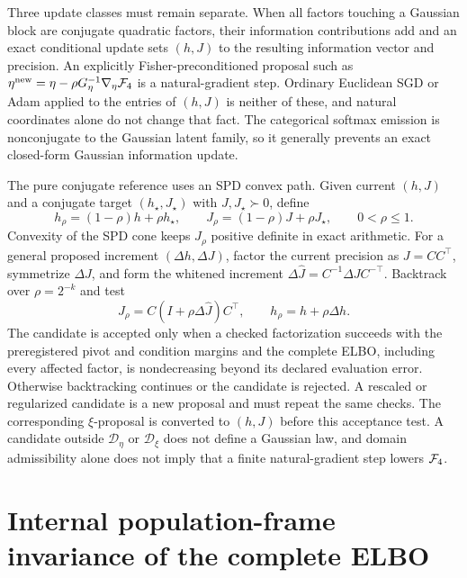 Three update classes must remain separate. When all factors touching a Gaussian block are conjugate quadratic factors, their information contributions add and an exact conditional update sets $(h,J)$ to the resulting information vector and precision. An explicitly Fisher-preconditioned proposal such as $\eta^{\mathrm{new}}=\eta-\rho G_\eta^{-1}\nabla_\eta\mathcal F_4$ is a natural-gradient step. Ordinary Euclidean SGD or Adam applied to the entries of $(h,J)$ is neither of these, and natural coordinates alone do not change that fact. The categorical softmax emission is nonconjugate to the Gaussian latent family, so it generally prevents an exact closed-form Gaussian information update.

The pure conjugate reference uses an SPD convex path. Given current $(h,J)$ and a conjugate target $(h_\star,J_\star)$ with $J,J_\star\succ0$, define
\begin{equation}
h_\rho=(1-\rho)h+\rho h_\star,
\qquad
J_\rho=(1-\rho)J+\rho J_\star,
\qquad 0<\rho\leq1.
\label{eq:spd-convex-damped-coordinate-path}
\end{equation}
Convexity of the SPD cone keeps $J_\rho$ positive definite in exact arithmetic. For a general proposed increment $(\Delta h,\Delta J)$, factor the current precision as $J=CC^\top$, symmetrize $\Delta J$, and form the whitened increment $\Delta\widehat J=C^{-1}\Delta JC^{-\top}$. Backtrack over $\rho=2^{-k}$ and test
\begin{equation}
J_\rho=C(I+\rho\Delta\widehat J)C^\top,
\qquad
h_\rho=h+\rho\Delta h.
\label{eq:whitened-spd-backtracking-path}
\end{equation}
The candidate is accepted only when a checked factorization succeeds with the preregistered pivot and condition margins and the complete ELBO, including every affected factor, is nondecreasing beyond its declared evaluation error. Otherwise backtracking continues or the candidate is rejected. A rescaled or regularized candidate is a new proposal and must repeat the same checks. The corresponding $\xi$-proposal is converted to $(h,J)$ before this acceptance test. A candidate outside $\mathcal D_\eta$ or $\mathcal D_\xi$ does not define a Gaussian law, and domain admissibility alone does not imply that a finite natural-gradient step lowers $\mathcal F_4$.

\section{Internal population-frame invariance of the complete ELBO}

